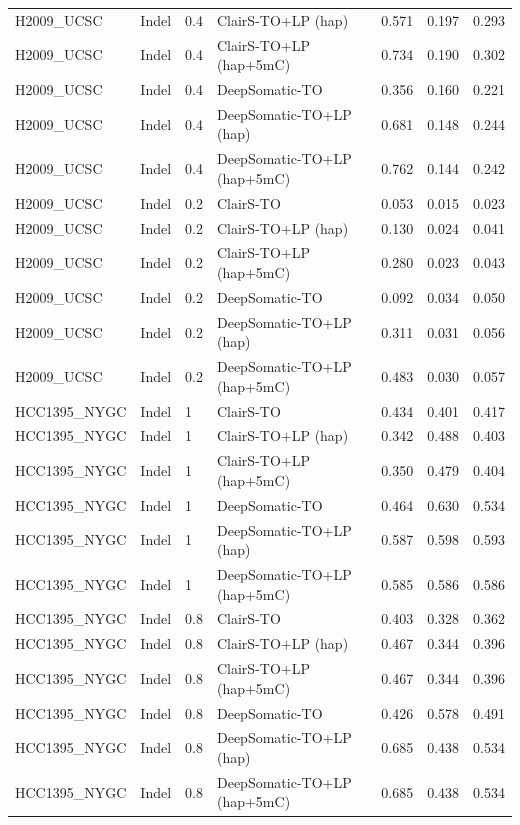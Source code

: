 \documentclass[pdflatex,sn-nature]{sn-jnl}
\begin{document}
{\begin{longtable}{@{}llllccc@{}}
  H2009\_UCSC & Indel & 0.4 & ClairS-TO+LP (hap) & 0.571 & 0.197 & 0.293 \\
  H2009\_UCSC & Indel & 0.4 & ClairS-TO+LP (hap+5mC) & 0.734 & 0.190 & 0.302 \\
  H2009\_UCSC & Indel & 0.4 & DeepSomatic-TO & 0.356 & 0.160 & 0.221 \\
  H2009\_UCSC & Indel & 0.4 & DeepSomatic-TO+LP (hap) & 0.681 & 0.148 & 0.244 \\
  H2009\_UCSC & Indel & 0.4 & DeepSomatic-TO+LP (hap+5mC) & 0.762 & 0.144 & 0.242 \\
  H2009\_UCSC & Indel & 0.2 & ClairS-TO & 0.053 & 0.015 & 0.023 \\
  H2009\_UCSC & Indel & 0.2 & ClairS-TO+LP (hap) & 0.130 & 0.024 & 0.041 \\
  H2009\_UCSC & Indel & 0.2 & ClairS-TO+LP (hap+5mC) & 0.280 & 0.023 & 0.043 \\
  H2009\_UCSC & Indel & 0.2 & DeepSomatic-TO & 0.092 & 0.034 & 0.050 \\
  H2009\_UCSC & Indel & 0.2 & DeepSomatic-TO+LP (hap) & 0.311 & 0.031 & 0.056 \\
  H2009\_UCSC & Indel & 0.2 & DeepSomatic-TO+LP (hap+5mC) & 0.483 & 0.030 & 0.057 \\
  HCC1395\_NYGC & Indel & 1 & ClairS-TO & 0.434 & 0.401 & 0.417 \\
  HCC1395\_NYGC & Indel & 1 & ClairS-TO+LP (hap) & 0.342 & 0.488 & 0.403 \\
  HCC1395\_NYGC & Indel & 1 & ClairS-TO+LP (hap+5mC) & 0.350 & 0.479 & 0.404 \\
  HCC1395\_NYGC & Indel & 1 & DeepSomatic-TO & 0.464 & 0.630 & 0.534 \\
  HCC1395\_NYGC & Indel & 1 & DeepSomatic-TO+LP (hap) & 0.587 & 0.598 & 0.593 \\
  HCC1395\_NYGC & Indel & 1 & DeepSomatic-TO+LP (hap+5mC) & 0.585 & 0.586 & 0.586 \\
  HCC1395\_NYGC & Indel & 0.8 & ClairS-TO & 0.403 & 0.328 & 0.362 \\
  HCC1395\_NYGC & Indel & 0.8 & ClairS-TO+LP (hap) & 0.467 & 0.344 & 0.396 \\
  HCC1395\_NYGC & Indel & 0.8 & ClairS-TO+LP (hap+5mC) & 0.467 & 0.344 & 0.396 \\
  HCC1395\_NYGC & Indel & 0.8 & DeepSomatic-TO & 0.426 & 0.578 & 0.491 \\
  HCC1395\_NYGC & Indel & 0.8 & DeepSomatic-TO+LP (hap) & 0.685 & 0.438 & 0.534 \\
  HCC1395\_NYGC & Indel & 0.8 & DeepSomatic-TO+LP (hap+5mC) & 0.685 & 0.438 & 0.534 \\

\end{longtable}}
\end{document}
